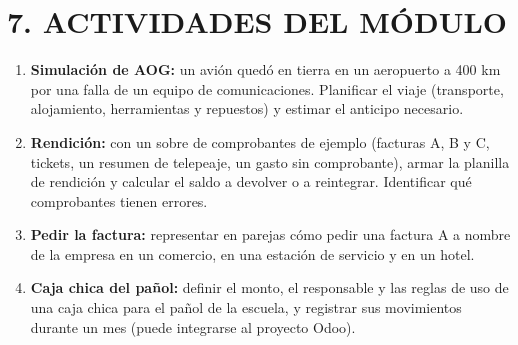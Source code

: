 \section*{7. ACTIVIDADES DEL MÓDULO}

\begin{enumerate}
  \item \textbf{Simulación de AOG:} un avión quedó en tierra en un aeropuerto a 400 km por una
        falla de un equipo de comunicaciones. Planificar el viaje (transporte, alojamiento,
        herramientas y repuestos) y estimar el anticipo necesario.
  \item \textbf{Rendición:} con un sobre de comprobantes de ejemplo (facturas A, B y C,
        tickets, un resumen de telepeaje, un gasto sin comprobante), armar la planilla de
        rendición y calcular el saldo a devolver o a reintegrar. Identificar qué comprobantes
        tienen errores.
  \item \textbf{Pedir la factura:} representar en parejas cómo pedir una factura A a nombre de
        la empresa en un comercio, en una estación de servicio y en un hotel.
  \item \textbf{Caja chica del pañol:} definir el monto, el responsable y las reglas de uso de
        una caja chica para el pañol de la escuela, y registrar sus movimientos durante un mes
        (puede integrarse al proyecto Odoo).
\end{enumerate}
